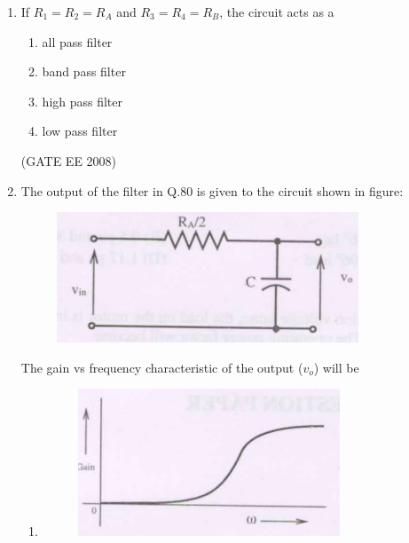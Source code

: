 \documentclass[journal,12pt,onecolumn]{IEEEtran}
\theoremstyle{remark}
\begin{document}
\begin{enumerate}[start=1, label=Q.\arabic*]
\item  If $R_1 = R_2 = R_A$ and $R_3 = R_4 = R_B$, the circuit acts as a
\begin{multicols}{2}
\begin{enumerate}
    \item all pass filter
    \item band pass filter
    \item high pass filter
    \item low pass filter
\end{enumerate}
\end{multicols}
\hfill (GATE EE 2008) \\[5mm]

\item  The output of the filter in Q.80 is given to the circuit shown in figure:

\begin{figure}
    \centering
    \includegraphics[width=\columnwidth]{Fig/q81.png}
    \caption{}
\end{figure}
The gain vs frequency characteristic of the output ($v_o$) will be
\begin{enumerate}
        
    \item 
    \begin{figure}[H]
        \includegraphics[width=\columnwidth]{Fig/q81-A.png}
        \caption{}
    \end{figure}



\end{enumerate}
\end{enumerate}
\end{document}
